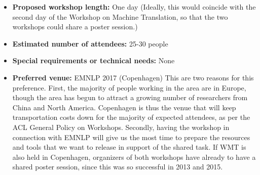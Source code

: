 \documentclass[11pt]{article}
\begin{document}
\begin{itemize}
\item \textbf{Proposed workshop length:} One day (Ideally, this would coincide with
the second day of the Workshop on Machine Translation, so that the two workshops could
share a poster session.)

\item \textbf{Estimated number of attendees:} 25-30 people

\item \textbf{Special requirements or technical needs:} None

\item \textbf{Preferred venue:} EMNLP 2017 (Copenhagen)
This are two reasons for this preference. First, the majority of people working in the
area are in Europe, though the area has begun to attract a growing number of researchers
from China and North America. Copenhagen is thus the venue that will keep transportation
costs down for the majority of expected attendees, as per the ACL General Policy on
Workshops. Secondly, having the workshop in connection with EMNLP will
give us the most time to prepare the resources and tools that we want to release in
support of the shared task.  If WMT is also held in Copenhagen, organizers of both
workshops have already to have a shared poster session, since this was so successful
in 2013 and 2015.
\end{itemize}
\end{document}
